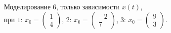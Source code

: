 \documentclass[a5paper, 10pt]{article}
\theoremstyle{definition}
\theoremstyle{plain}
\theoremstyle{remark}
\begin{document}
\begin{figure}[h!]
\caption{Моделирование 6, только зависимости $x(t)$, \\при  $1: \, x_0 = \begin{pmatrix} 1 \\ 4 \end{pmatrix}$, $2: \, x_0 = \begin{pmatrix} -2 \\ 7 \end{pmatrix}$, $3: \, x_0 = \begin{pmatrix} 9 \\ 3 \end{pmatrix}$.}
\end{figure}
\end{document}
